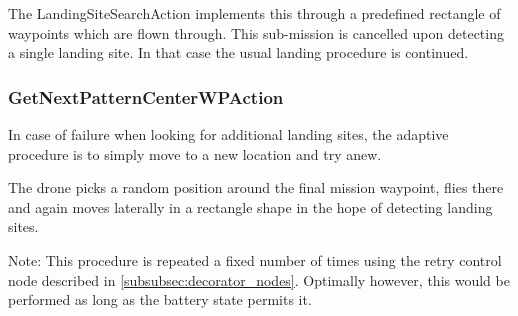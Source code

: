 The LandingSiteSearchAction implements this through a predefined rectangle of waypoints which are flown through. This sub-mission is cancelled upon detecting a single landing site. In that case the usual landing procedure is continued.

\subsubsection{GetNextPatternCenterWPAction}

In case of failure when looking for additional landing sites, the adaptive procedure is to simply move to a new location and try anew. 

The drone picks a random position around the final mission waypoint, flies there and again moves laterally in a rectangle shape in the hope of detecting landing sites.

Note: This procedure is repeated a fixed number of times using the retry control node described in \cref{subsubsec:decorator_nodes}. Optimally however, this would be performed as long as the battery state permits it. 

